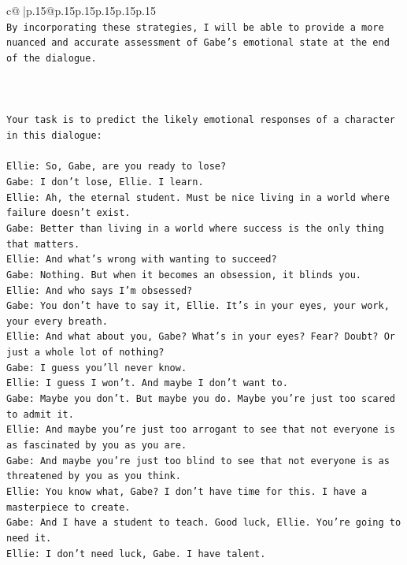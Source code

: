 \documentclass{article}
\begin{document}
{\begin{supertabular}{c@{$\;$}|p{.15\linewidth}@{}p{.15\linewidth}p{.15\linewidth}p{.15\linewidth}p{.15\linewidth}p{.15\linewidth}}
{{{\\ 
\texttt{By incorporating these strategies, I will be able to provide a more nuanced and accurate assessment of Gabe's emotional state at the end of the dialogue.} \\
\\ 
\\ 
\\ 
\texttt{Your task is to predict the likely emotional responses of a character in this dialogue:} \\
\\ 
\texttt{Ellie: So, Gabe, are you ready to lose?} \\
\texttt{Gabe: I don't lose, Ellie. I learn.} \\
\texttt{Ellie: Ah, the eternal student. Must be nice living in a world where failure doesn't exist.} \\
\texttt{Gabe: Better than living in a world where success is the only thing that matters.} \\
\texttt{Ellie: And what's wrong with wanting to succeed? } \\
\texttt{Gabe: Nothing. But when it becomes an obsession, it blinds you.} \\
\texttt{Ellie: And who says I'm obsessed?} \\
\texttt{Gabe: You don't have to say it, Ellie. It's in your eyes, your work, your every breath.} \\
\texttt{Ellie: And what about you, Gabe? What's in your eyes? Fear? Doubt? Or just a whole lot of nothing?} \\
\texttt{Gabe: I guess you'll never know.} \\
\texttt{Ellie: I guess I won't. And maybe I don't want to.} \\
\texttt{Gabe: Maybe you don't. But maybe you do. Maybe you're just too scared to admit it.} \\
\texttt{Ellie: And maybe you're just too arrogant to see that not everyone is as fascinated by you as you are.} \\
\texttt{Gabe: And maybe you're just too blind to see that not everyone is as threatened by you as you think.} \\
\texttt{Ellie: You know what, Gabe? I don't have time for this. I have a masterpiece to create.} \\
\texttt{Gabe: And I have a student to teach. Good luck, Ellie. You're going to need it.} \\
\texttt{Ellie: I don't need luck, Gabe. I have talent.} \\
}}}
\end{supertabular}}
\end{document}
